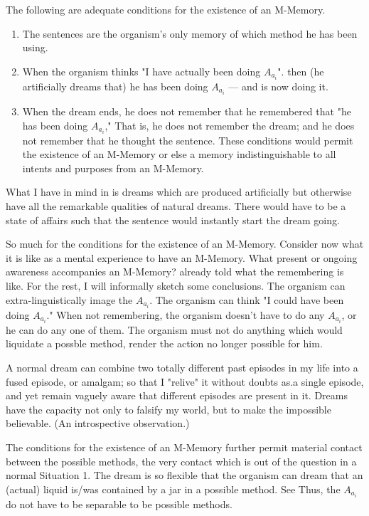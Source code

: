  The following are adequate conditions for the existence 
of an M-Memory. 
\begin{enumerate}
\item The sentences are the organism's only memory of which 
method he has been using. 

\item When the organism thinks "I have actually been doing $A_{a_i}$".
then (he artificially dreams that) he has been doing $A_{a_i}$ --- and is 
now doing it. 

\item When the dream ends, he does not remember that he 
remembered that "he has been doing $A_{a_i}$," That is, he does not remember 
the dream; and he does not remember that he thought the sentence. These 
conditions would permit the existence of an M-Memory or else a memory 
indistinguishable to all intents and purposes from an M-Memory. 
\end{enumerate}

What I have in mind in  is dreams which are produced 
artificially but otherwise have all the remarkable qualities of natural dreams. 
There would have to be a state of affairs such that the sentence would 
instantly start the dream going. 

So much for the conditions for the existence of an M-Memory. 
Consider now what it is like as a mental experience to have an M-Memory. 
What present or ongoing awareness accompanies an M-Memory? 
 already told what the remembering is like. For the rest, I will 
informally sketch some conclusions. The organism can extra-linguistically 
image the $A_{a_i}$. The organism can think "I could have been doing $A_{a_i}$." When 
not remembering, the organism doesn't have to do any $A_{a_i}$, or he can do any 
one of them. The organism must not do anything which would liquidate a 
possble method, render the action no longer possible for him. 

 A normal dream can combine two totally different 
past episodes in my life into a fused episode, or amalgam; so that I "relive" it 
without doubts as.a single episode, and yet remain vaguely aware that 
different episodes are present in it. Dreams have the capacity not only to 
falsify my world, but to make the impossible believable. (An introspective 
observation.) 

 The conditions for the existence of an M-Memory 
further permit material contact between the possible methods, the very 
contact which is out of the question in a normal Situation 1. The dream is so 
flexible that the organism can dream that an (actual) liquid is\slash was contained 
by a jar in a possible method. See  Thus, the $A_{a_i}$ do not have 
to be separable to be possible methods. 

